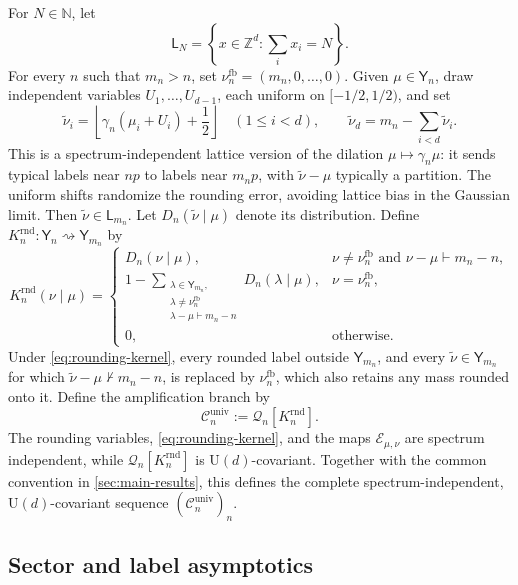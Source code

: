 \documentclass[11pt]{article}
\theoremstyle{remark}
\theoremstyle{plain}
\newcommand{\cC}{\mathcal C}
\newcommand{\cE}{\mathcal E}
\newcommand{\U}{\mathrm U}
\begin{document}
For \(N\in\mathbb N\), let
\[
  \mathsf L_N=\left\{x\in\mathbb Z^d:\sum_i x_i=N\right\}.
\]
For every \(n\) such that \(m_n>n\), set
\(\nu_n^{\mathrm{fb}}=(m_n,0,\ldots,0)\).
Given \(\mu\in\mathsf Y_n\), draw independent variables
\(U_1,\ldots,U_{d-1}\), each uniform on \([-1/2,1/2)\), and set
\begin{equation}\label{eq:randomized-rounding}
  \widetilde\nu_i
  =\left\lfloor\gamma_n(\mu_i+U_i)+\frac12\right\rfloor
  \quad(1\le i<d),
  \qquad
  \widetilde\nu_d=m_n-\sum_{i<d}\widetilde\nu_i.
\end{equation}
This is a spectrum-independent lattice version of the dilation
\(\mu\mapsto\gamma_n\mu\): it sends typical labels near \(np\) to labels near
\(m_np\), with \(\widetilde\nu-\mu\) typically a partition.  The uniform
shifts randomize the rounding error, avoiding lattice bias in the Gaussian
limit.
Then \(\widetilde\nu\in\mathsf L_{m_n}\).  Let
\(D_n(\widetilde\nu\mid\mu)\) denote its distribution.  Define
\(K_n^{\mathrm{rnd}}:\mathsf Y_n\rightsquigarrow\mathsf Y_{m_n}\) by
\begin{equation}\label{eq:rounding-kernel}
  K_n^{\mathrm{rnd}}(\nu\mid\mu)=
  \begin{cases}
    D_n(\nu\mid\mu),
      &\nu\ne\nu_n^{\mathrm{fb}}
       \text{ and }\nu-\mu\vdash m_n-n,\\[1mm]
    1-\displaystyle\sum_{\substack{\lambda\in\mathsf Y_{m_n},\\
            \lambda\ne\nu_n^{\mathrm{fb}}\\
            \lambda-\mu\vdash m_n-n}}
       D_n(\lambda\mid\mu),
      &\nu=\nu_n^{\mathrm{fb}},\\[4mm]
    0,&\text{otherwise}.
  \end{cases}
\end{equation}
Under \eqref{eq:rounding-kernel}, every rounded label outside
\(\mathsf Y_{m_n}\), and every
\(\widetilde\nu\in\mathsf Y_{m_n}\) for which
\(\widetilde\nu-\mu\not\vdash m_n-n\), is replaced by
\(\nu_n^{\mathrm{fb}}\), which also retains any mass rounded onto it.
Define the amplification branch by
\[
  \cC_n^{\mathrm{univ}}:=\mathcal Q_n[K_n^{\mathrm{rnd}}].
\]
The rounding variables, \eqref{eq:rounding-kernel}, and the maps
\(\cE_{\mu,\nu}\) are spectrum independent, while
\(\mathcal Q_n[K_n^{\mathrm{rnd}}]\) is \(\U(d)\)-covariant.  Together
with the common convention in \cref{sec:main-results}, this defines the
complete spectrum-independent, \(\U(d)\)-covariant sequence
\((\cC_n^{\mathrm{univ}})_n\).

\subsection{Sector and label asymptotics}
\label{sec:uniform-estimates-achievability}
\end{document}
